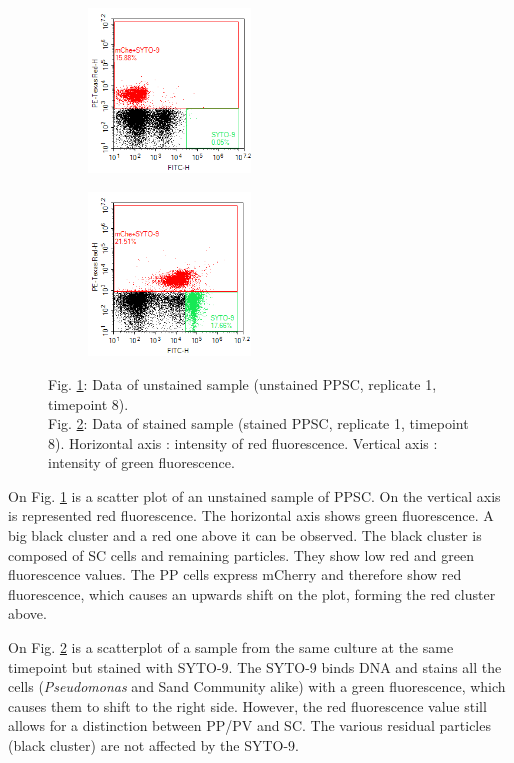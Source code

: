 \documentclass[a4paper, 10pt, conference]{ieeeconf}   %
\begin{document}
\begin{figure}
		\hspace{-0.3cm}
		\begin{subfigure}{.25\textwidth}
			\centering			
			\includegraphics[width=4.3cm]{t8_unstained_ppsc1.png}
			\caption{}
			\label{scatter1}			
		\end{subfigure}%
		\begin{subfigure}{.22\textwidth}		
			\centering			
			\includegraphics[width=4.3cm]{t8_stained_ppsc1.png}
			\caption{}
			\label{scatter2}			
		\end{subfigure}
		\caption*{Fig. \ref{scatter1}: Data of unstained sample (unstained PPSC, replicate 1, timepoint 8). \\ Fig. \ref{scatter2}: Data of stained sample (stained PPSC, replicate 1, timepoint 8). Horizontal axis : intensity of red fluorescence. Vertical axis : intensity of green fluorescence.}
		\label{scatterplot}
		\vspace{-0.5cm}
\end{figure}



On Fig. \ref{scatter1} is a scatter plot of an unstained sample of PPSC. On the vertical axis is represented red fluorescence. The horizontal axis shows green fluorescence. A big black cluster and a red one above it can be observed. The black cluster is composed of SC cells and remaining particles. They show  low red and green fluorescence values. The PP cells express mCherry and therefore show red fluorescence, which causes an upwards shift on the plot, forming the red cluster above.

On Fig. \ref{scatter2} is a scatterplot of a sample from the same culture at the same timepoint but stained with SYTO-9. The SYTO-9 binds DNA and stains all the cells (\textit{Pseudomonas} and Sand Community alike) with a green fluorescence, which causes them to shift to the right side. However, the red fluorescence value still allows for a distinction between PP/PV and SC. The various residual particles (black cluster) are not affected by the SYTO-9. 
\end{document}
